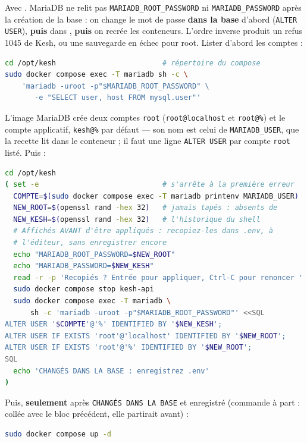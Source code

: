 \documentclass[a4paper,11pt,oneside]{article}
\begin{document}
\begin{sloppypar}
Avec . MariaDB ne relit pas \texttt{MARIADB\_ROOT\_PASSWORD} ni \texttt{MARIADB\_PASSWORD} après la création de la base : on change le mot de passe \textbf{dans la base} d'abord (\texttt{ALTER USER}), \textbf{puis} dans , \textbf{puis} on recrée les conteneurs. L'ordre inverse produit un refus 1045 de Kesh, ou une sauvegarde en échec pour root. Lister d'abord les comptes :
\end{sloppypar}

\begin{lstlisting}[language=bash]
cd /opt/kesh                         # répertoire du compose
sudo docker compose exec -T mariadb sh -c \
    'mariadb -uroot -p"$MARIADB_ROOT_PASSWORD" \
       -e "SELECT user, host FROM mysql.user"'
\end{lstlisting}

L'image MariaDB crée deux comptes \texttt{root} (\texttt{root@localhost} et \texttt{root@\%}) et le compte applicatif, \texttt{kesh@\%} par défaut --- son nom est celui de \texttt{MARIADB\_USER}, que la recette lit dans le conteneur ; il faut une ligne \texttt{ALTER USER} par compte \texttt{root} listé. Puis :

\begin{lstlisting}[language=bash]
cd /opt/kesh
( set -e                             # s'arrête à la première erreur
  COMPTE=$(sudo docker compose exec -T mariadb printenv MARIADB_USER)
  NEW_ROOT=$(openssl rand -hex 32)   # jamais tapés : absents de
  NEW_KESH=$(openssl rand -hex 32)   # l'historique du shell
  # Affichés AVANT d'être appliqués : recopiez-les dans .env, à
  # l'éditeur, sans enregistrer encore
  echo "MARIADB_ROOT_PASSWORD=$NEW_ROOT"
  echo "MARIADB_PASSWORD=$NEW_KESH"
  read -r -p 'Recopiés ? Entrée pour appliquer, Ctrl-C pour renoncer '
  sudo docker compose stop kesh-api
  sudo docker compose exec -T mariadb \
      sh -c 'mariadb -uroot -p"$MARIADB_ROOT_PASSWORD"' <<SQL
ALTER USER '$COMPTE'@'%' IDENTIFIED BY '$NEW_KESH';
ALTER USER IF EXISTS 'root'@'localhost' IDENTIFIED BY '$NEW_ROOT';
ALTER USER IF EXISTS 'root'@'%' IDENTIFIED BY '$NEW_ROOT';
SQL
  echo 'CHANGÉS DANS LA BASE : enregistrez .env'
)
\end{lstlisting}

\noindent Puis, \textbf{seulement} après \texttt{CHANGÉS DANS LA BASE} et  enregistré (commande à part : collée avec le bloc précédent, elle partirait avant) :

\begin{lstlisting}[language=bash]
sudo docker compose up -d
\end{lstlisting}
\end{document}
